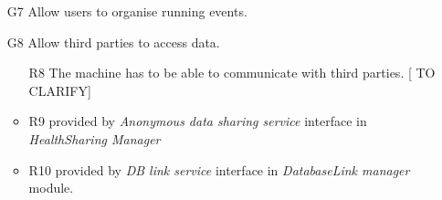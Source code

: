 \documentclass[DD.tex]{subfiles}
\begin{document}
\begin{itemize}
	\item [G7] Allow users to organise running events.
	
	\item [G8] Allow third parties to access data.
	\begin{itemize}
		\item [R8] The machine has to be able to communicate with 
		third parties. [	TO CLARIFY]
		\item R9 provided by \textit{Anonymous data sharing service} interface in \textit{HealthSharing Manager}
		\item R10 provided by \textit{DB link service} interface in \textit{DatabaseLink manager} module.
	\end{itemize}
	
\end{itemize}
\end{document}

